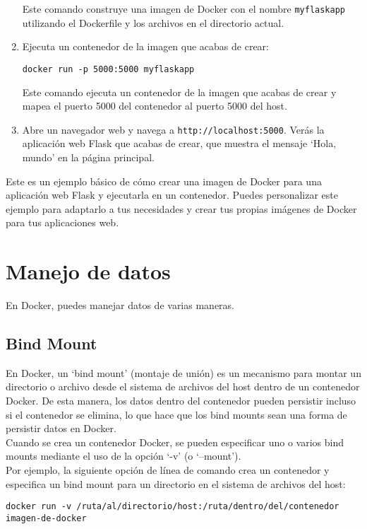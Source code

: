 \documentclass{article}
\begin{document}
\begin{enumerate}
          Este comando construye una imagen de Docker con el nombre \lstinline{myflaskapp} utilizando el Dockerfile y los archivos en el directorio actual.
    \item Ejecuta un contenedor de la imagen que acabas de crear:
          \begin{lstlisting}[numbers=none]
docker run -p 5000:5000 myflaskapp
\end{lstlisting}

          Este comando ejecuta un contenedor de la imagen que acabas de crear y mapea el puerto 5000 del contenedor al puerto 5000 del host.
    \item Abre un navegador web y navega a \lstinline{http://localhost:5000}. Verás la aplicación web Flask que acabas de crear, que muestra el mensaje \enquote*{Hola, mundo} en la página principal.

\end{enumerate}

Este es un ejemplo básico de cómo crear una imagen de Docker para una aplicación web Flask y ejecutarla en un contenedor. Puedes personalizar este ejemplo para adaptarlo a tus necesidades y crear tus propias imágenes de Docker para tus aplicaciones web.
\newpage
\section{Manejo de datos}
En Docker, puedes manejar datos de varias maneras.

\subsection{Bind Mount}

En Docker, un \enquote*{bind mount} (montaje de unión) es un mecanismo para montar un directorio o archivo desde el sistema de archivos del host dentro de un contenedor Docker. De esta manera, los datos dentro del contenedor pueden persistir incluso si el contenedor se elimina, lo que hace que los bind mounts sean una forma de persistir datos en Docker.
\\
Cuando se crea un contenedor Docker, se pueden especificar uno o varios bind mounts mediante el uso de la opción \enquote*{-v} (o \enquote*{--mount}).\\ Por ejemplo, la siguiente opción de línea de comando crea un contenedor y especifica un bind mount para un directorio en el sistema de archivos del host:
\begin{lstlisting}[numbers=none]
      docker run -v /ruta/al/directorio/host:/ruta/dentro/del/contenedor imagen-de-docker
\end{lstlisting}
\end{document}
